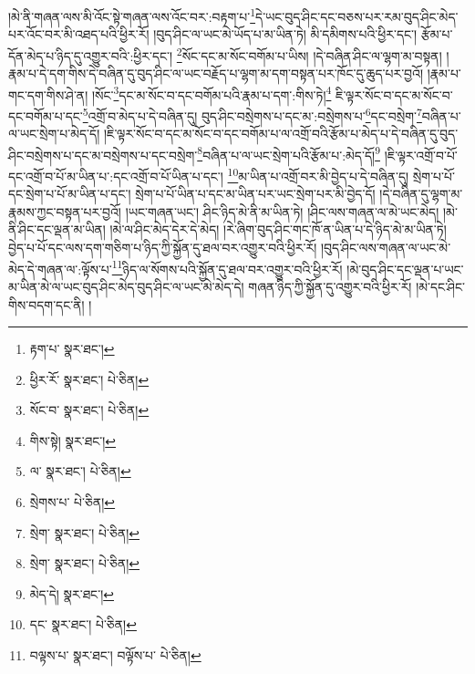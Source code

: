 །མེ་ནི་གཞན་ལས་མི་འོང་སྟེ་གཞན་ལས་འོང་བར་:བརྟག་པ་\footnote{རྟག་པ་  སྣར་ཐང་། }དེ་ཡང་བུད་ཤིང་དང་བཅས་པར་རམ་བུད་ཤིང་མེད་པར་འོང་བར་མི་འཐད་པའི་ཕྱིར་རོ། །བུད་ཤིང་ལ་ཡང་མེ་ཡོད་པ་མ་ཡིན་ཏེ། མི་དམིགས་པའི་ཕྱིར་དང་། རྩོམ་པ་དོན་མེད་པ་ཉིད་དུ་འགྱུར་བའི་:ཕྱིར་དང་། \footnote{ཕྱིར་རོ་  སྣར་ཐང་།  པེ་ཅིན། }སོང་དང་མ་སོང་བགོམ་པ་ཡིས། །དེ་བཞིན་ཤིང་ལ་ལྷག་མ་བསྟན། །རྣམ་པ་དེ་དག་གིས་དེ་བཞིན་དུ་བུད་ཤིང་ལ་ཡང་བརྗོད་པ་ལྷག་མ་དག་བསྟན་པར་ཁོང་དུ་ཆུད་པར་བྱའོ། །རྣམ་པ་གང་དག་གིས་ཤེ་ན། །སོང་\footnote{སོང་བ་  སྣར་ཐང་།  པེ་ཅིན། }དང་མ་སོང་བ་དང་བགོམ་པའི་རྣམ་པ་དག་:གིས་ཏེ།\footnote{གིས་སྟེ།  སྣར་ཐང་། } ཇི་ལྟར་སོང་བ་དང་མ་སོང་བ་དང་བགོམ་པ་དང་\footnote{ལ་  སྣར་ཐང་།  པེ་ཅིན། }འགྲོ་བ་མེད་པ་དེ་བཞིན་དུ། བུད་ཤིང་བསྲེགས་པ་དང་མ་:བསྲེགས་པ་\footnote{སྲེགས་པ་  པེ་ཅིན། }དང་བསྲེག་\footnote{སྲེག་  སྣར་ཐང་།  པེ་ཅིན། }བཞིན་པ་ལ་ཡང་སྲེག་པ་མེད་དོ། །ཇི་ལྟར་སོང་བ་དང་མ་སོང་བ་དང་བགོམ་པ་ལ་འགྲོ་བའི་རྩོམ་པ་མེད་པ་དེ་བཞིན་དུ་བུད་ཤིང་བསྲེགས་པ་དང་མ་བསྲེགས་པ་དང་བསྲེག་\footnote{སྲེག་  སྣར་ཐང་།  པེ་ཅིན། }བཞིན་པ་ལ་ཡང་སྲེག་པའི་རྩོམ་པ་:མེད་དོ།\footnote{མེད་དེ།  སྣར་ཐང་། } །ཇི་ལྟར་འགྲོ་བ་པོ་དང་འགྲོ་བ་པོ་མ་ཡིན་པ་:དང་འགྲོ་བ་པོ་ཡིན་པ་དང་། \footnote{དང་  སྣར་ཐང་།  པེ་ཅིན། }མ་ཡིན་པ་འགྲོ་བར་མི་བྱེད་པ་དེ་བཞིན་དུ། སྲེག་པ་པོ་དང་སྲེག་པ་པོ་མ་ཡིན་པ་དང་། སྲེག་པ་པོ་ཡིན་པ་དང་མ་ཡིན་པར་ཡང་སྲེག་པར་མི་བྱེད་དོ། །དེ་བཞིན་དུ་ལྷག་མ་རྣམས་ཀྱང་བསྟན་པར་བྱའོ། །ཡང་གཞན་ཡང་། ཤིང་ཉིད་མེ་ནི་མ་ཡིན་ཏེ། །ཤིང་ལས་གཞན་ལ་མེ་ཡང་མེད། །མེ་ནི་ཤིང་དང་ལྡན་མ་ཡིན། །མེ་ལ་ཤིང་མེད་དེར་དེ་མེད། །རེ་ཞིག་བུད་ཤིང་གང་ཁོ་ན་ཡིན་པ་དེ་ཉིད་མེ་མ་ཡིན་ཏེ། བྱེད་པ་པོ་དང་ལས་དག་གཅིག་པ་ཉིད་ཀྱི་སྐྱོན་དུ་ཐལ་བར་འགྱུར་བའི་ཕྱིར་རོ། །བུད་ཤིང་ལས་གཞན་ལ་ཡང་མེ་མེད་དེ་གཞན་ལ་:ལྟོས་པ་\footnote{བལྟས་པ་  སྣར་ཐང་། བལྟོས་པ་  པེ་ཅིན། }ཉིད་ལ་སོགས་པའི་སྐྱོན་དུ་ཐལ་བར་འགྱུར་བའི་ཕྱིར་རོ། །མེ་བུད་ཤིང་དང་ལྡན་པ་ཡང་མ་ཡིན་མེ་ལ་ཡང་བུད་ཤིང་མེད་བུད་ཤིང་ལ་ཡང་མེ་མེད་དེ། གཞན་ཉིད་ཀྱི་སྐྱོན་དུ་འགྱུར་བའི་ཕྱིར་རོ། །མེ་དང་ཤིང་གིས་བདག་དང་ནི། །
